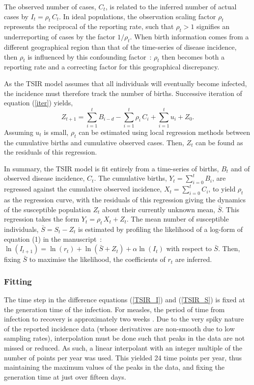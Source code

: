 \documentclass[10pt]{article}
\begin{document}
The observed number of cases, $C_t$, is related to the inferred number of actual cases by $I_t = \rho_t\,C_t$. In ideal populations, the observation scaling factor $\rho_t$ represents the reciprocal of the reporting rate, such that $\rho_t > 1$ signifies an underreporting of cases by the factor $1/\rho_t$. When birth information comes from a different geographical region than that of the time-series of disease incidence, then $\rho_t$ is influenced by this confounding factor~: $\rho_t$ then becomes both a reporting rate and a correcting factor for this geographical discrepancy.

As the TSIR model assumes that all individuals will eventually become infected, the incidence must therefore track the number of births. Successive iteration of equation (\ref{iter}) yields,
\begin{equation}
Z_{t+1} = \sum_{i=1}^t B_{i-d} - \sum_{i=1}^t \rho_i \, C_i + \sum_{i=1}^t u_i + Z_0.
\label{sums}
\end{equation}
Assuming $u_t$ is small, $\rho_t$ can be estimated using local regression methods between the cumulative births and cumulative observed cases. Then, $Z_t$ can be found as the residuals of this regression. 

In summary, the TSIR model is fit entirely from a time-series of births, $B_t$ and of observed disease incidence, $C_t$. The cumulative births, $Y_t = \sum_{i=0}^t B_i$, are regressed against the cumulative observed incidence, $X_t = \sum_{i=0}^t C_i$, to yield $\rho_t$ as the regression curve, with the residuals of this regression giving the dynamics of the susceptible population $Z_t$ about their currently unknown mean, $\bar{S}$. This regression takes the form $Y_t = \rho_t\,X_t + Z_t$. The mean number of susceptible individuals, $\bar{S} = S_t - Z_t$ is estimated by profiling the likelihood of a log-form of equation (1) in the manuscript~: $\ln(I_{t+1}) = \ln(r_t) + \ln(\bar{S} + Z_t) + \alpha \ln(I_t)$ with respect to $\bar{S}$. Then, fixing $\bar{S}$ to maximise the likelihood, the coefficients of $r_t$ are inferred.

 







\subsubsection*{Fitting}

The time step in the difference equations (\ref{TSIR_I}) and (\ref{TSIR_S}) is fixed at the generation time of the infection. For measles, the period of time from infection to recovery is approximately two weeks \cite{Anderson1991}. Due to the very spiky nature of the reported incidence data (whose derivatives are non-smooth due to low sampling rates), interpolation must be done such that peaks in the data are not missed or reduced. As such, a linear interpolant with an integer multiple of the number of points per year was used. This yielded 24 time points per year, thus maintaining the maximum values of the peaks in the data, and fixing the generation time at just over fifteen days.
\end{document}
